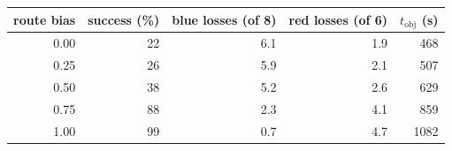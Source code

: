 \begin{tabular}{rrrrr}
\toprule
route bias & success (\%) & blue losses (of 8) & red losses (of 6) & $t_{\text{obj}}$ (s) \\
\midrule
0.00 & 22 & 6.1 & 1.9 & 468 \\
0.25 & 26 & 5.9 & 2.1 & 507 \\
0.50 & 38 & 5.2 & 2.6 & 629 \\
0.75 & 88 & 2.3 & 4.1 & 859 \\
1.00 & 99 & 0.7 & 4.7 & 1082 \\
\bottomrule
\end{tabular}

